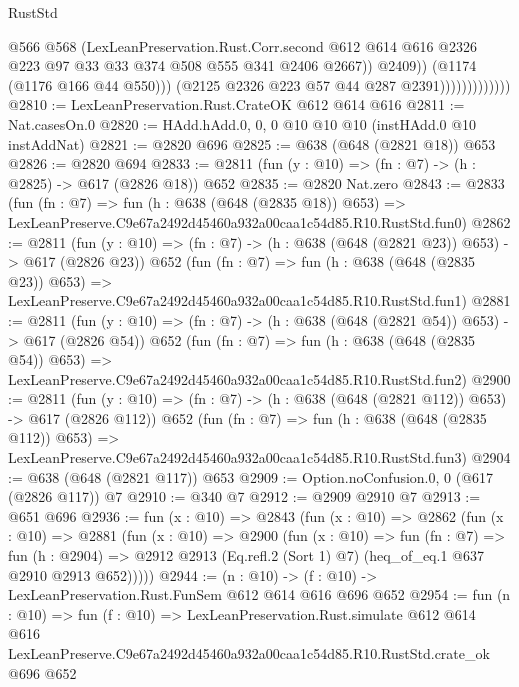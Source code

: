 \begin{lexlean}{RustStd}
\begin{coremodule}
                                    @566
                                    @568
                                    (LexLeanPreservation.Rust.Corr.second
                                      @612
                                      @614
                                      @616
                                      @2326
                                      @223
                                      @97
                                      @33
                                      @33
                                      @374
                                      @508
                                      @555
                                      @341
                                      @2406
                                      @2667))
                                  @2409))
                              (@1174 (@1176 @166 @44 @550)))
                            (@2125 @2326 @223 @57 @44 @287 @2391)))))))))))))
@2810 := LexLeanPreservation.Rust.CrateOK @612 @614 @616
@2811 := Nat.casesOn.{0}
@2820 := HAdd.hAdd.{0, 0, 0} @10 @10 @10 (instHAdd.{0} @10 instAddNat)
@2821 := @2820 @696
@2825 := @638 (@648 (@2821 @18)) @653
@2826 := @2820 @694
@2833 := @2811 (fun (y : @10) => (fn : @7) -> (h : @2825) -> @617 (@2826 @18)) @652
@2835 := @2820 Nat.zero
@2843 := @2833
    (fun (fn : @7) =>
    fun (h : @638 (@648 (@2835 @18)) @653) =>
    LexLeanPreserve.C9e67a2492d45460a932a00caa1c54d85.R10.RustStd.fun0)
@2862 := @2811
    (fun (y : @10) => (fn : @7) -> (h : @638 (@648 (@2821 @23)) @653) -> @617 (@2826 @23))
    @652
    (fun (fn : @7) =>
    fun (h : @638 (@648 (@2835 @23)) @653) =>
    LexLeanPreserve.C9e67a2492d45460a932a00caa1c54d85.R10.RustStd.fun1)
@2881 := @2811
    (fun (y : @10) => (fn : @7) -> (h : @638 (@648 (@2821 @54)) @653) -> @617 (@2826 @54))
    @652
    (fun (fn : @7) =>
    fun (h : @638 (@648 (@2835 @54)) @653) =>
    LexLeanPreserve.C9e67a2492d45460a932a00caa1c54d85.R10.RustStd.fun2)
@2900 := @2811
    (fun (y : @10) => (fn : @7) -> (h : @638 (@648 (@2821 @112)) @653) -> @617 (@2826 @112))
    @652
    (fun (fn : @7) =>
    fun (h : @638 (@648 (@2835 @112)) @653) =>
    LexLeanPreserve.C9e67a2492d45460a932a00caa1c54d85.R10.RustStd.fun3)
@2904 := @638 (@648 (@2821 @117)) @653
@2909 := Option.noConfusion.{0, 0} (@617 (@2826 @117)) @7
@2910 := @340 @7
@2912 := @2909 @2910 @7
@2913 := @651 @696
@2936 := fun (x : @10) =>
  @2843
    (fun (x : @10) =>
    @2862
      (fun (x : @10) =>
      @2881
        (fun (x : @10) =>
        @2900
          (fun (x : @10) =>
          fun (fn : @7) =>
          fun (h : @2904) =>
          @2912 @2913 (Eq.refl.{2} (Sort 1) @7) (heq_of_eq.{1} @637 @2910 @2913 @652)))))
@2944 := (n : @10) -> (f : @10) -> LexLeanPreservation.Rust.FunSem @612 @614 @616 @696 @652
@2954 := fun (n : @10) =>
  fun (f : @10) =>
  LexLeanPreservation.Rust.simulate
    @612
    @614
    @616
    LexLeanPreserve.C9e67a2492d45460a932a00caa1c54d85.R10.RustStd.crate_ok
    @696
    @652
\end{coremodule}
\end{lexlean}
